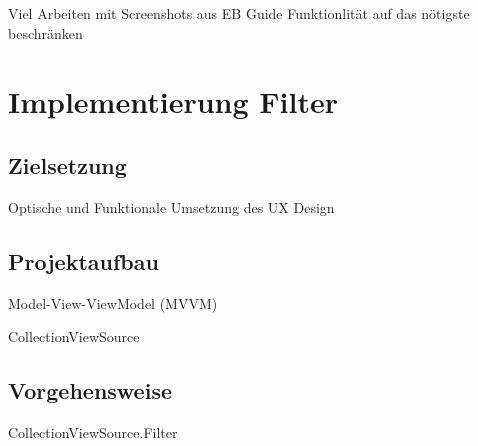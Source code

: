 Viel Arbeiten mit Screenshots aus EB Guide
Funktionlität auf das nötigste beschränken

\section {Implementierung Filter}
\subsection {Zielsetzung}
Optische und Funktionale Umsetzung des UX Design

\subsection {Projektaufbau}

Model-View-ViewModel (MVVM) 
\cite{.g}

CollectionViewSource
\cite{dotnetbot.}

\subsection {Vorgehensweise}

CollectionViewSource.Filter
\cite{dotnetbot.b}










